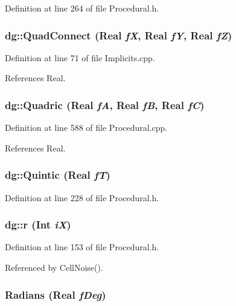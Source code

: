 Definition at line 264 of file Procedural.h.
\subsubsection{ dg::Quad\-Connect ({\bf Real} {\em f\-X}, {\bf Real} {\em f\-Y}, {\bf Real} {\em f\-Z})}\label{namespacedg_a77}




Definition at line 71 of file Implicits.cpp.

References Real.
\subsubsection{ dg::Quadric ({\bf Real} {\em f\-A}, {\bf Real} {\em f\-B}, {\bf Real} {\em f\-C})}\label{namespacedg_a72}




Definition at line 588 of file Procedural.cpp.

References Real.
\subsubsection{ dg::Quintic ({\bf Real} {\em f\-T})\hspace{0.3cm}{\tt  [inline]}}\label{namespacedg_a153}




Definition at line 228 of file Procedural.h.
\subsubsection{ dg::r ({\bf Int} {\em i\-X})\hspace{0.3cm}{\tt  [inline]}}\label{namespacedg_a145}




Definition at line 153 of file Procedural.h.

Referenced by Cell\-Noise().
\subsubsection{ Radians ({\bf Real} {\em f\-Deg})\hspace{0.3cm}{\tt  [inline]}}\label{namespacedg_a88}




